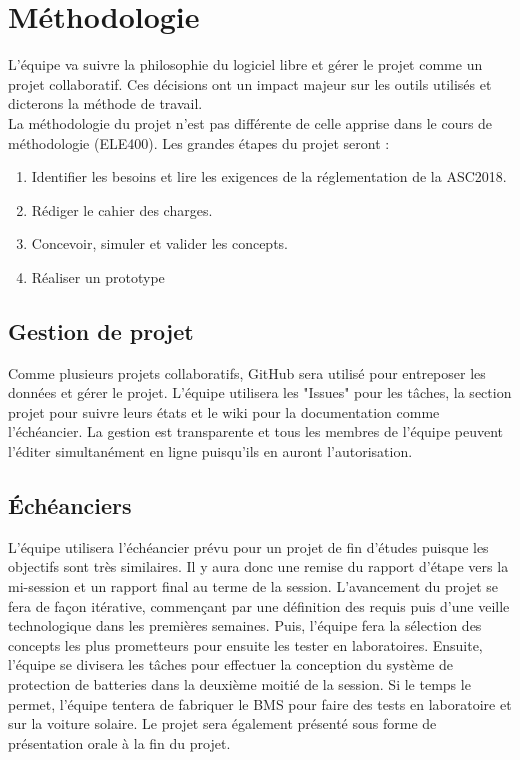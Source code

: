 \section{Méthodologie}
L'équipe va suivre la philosophie du logiciel libre et gérer le projet comme un projet collaboratif. Ces décisions 
ont un impact majeur sur les outils utilisés et dicterons la méthode de travail. \\
La méthodologie du projet n'est pas différente de celle apprise dans le cours de méthodologie (ELE400). Les grandes étapes du projet seront : 
\begin{enumerate}
	\item Identifier les besoins et lire les exigences de la réglementation de la ASC2018.
	\item Rédiger le cahier des charges.
	\item Concevoir, simuler et valider les concepts.
	\item Réaliser un prototype
\end{enumerate}

\subsection{Gestion de projet}
Comme plusieurs projets collaboratifs, GitHub sera utilisé pour entreposer les données et gérer le projet. L'équipe utilisera les "Issues" pour les tâches, la section projet pour suivre leurs états et le wiki pour la documentation comme l'échéancier. La gestion est transparente et tous les membres de l'équipe peuvent l'éditer simultanément en ligne puisqu'ils en auront l'autorisation. 

\subsection{Échéanciers}
L'équipe utilisera l'échéancier prévu pour un projet de fin d'études puisque les objectifs sont très similaires. Il y aura donc une remise du rapport d'étape vers la mi-session et un rapport final au terme de la session. L'avancement du projet se fera de façon itérative, commençant par une définition des requis puis d'une veille technologique dans les premières semaines. Puis, l'équipe fera la sélection des concepts les plus prometteurs pour ensuite les tester en laboratoires. Ensuite, l'équipe se divisera les tâches pour effectuer la conception du système de protection de batteries dans la deuxième moitié de la session. Si le temps le permet, l'équipe tentera de fabriquer le BMS pour faire des tests en laboratoire et sur la voiture solaire. Le projet sera également présenté sous forme de présentation orale à la fin du projet.

